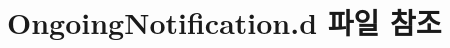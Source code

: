 \hypertarget{OngoingNotification_8d}{\section{Ongoing\-Notification.\-d 파일 참조}
\label{OngoingNotification_8d}
}
